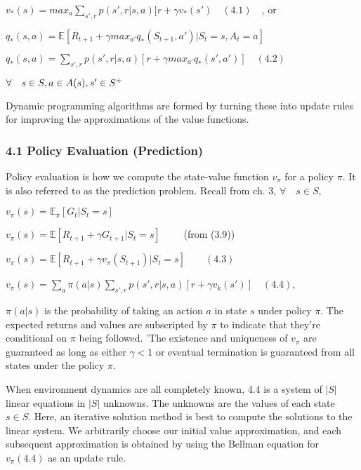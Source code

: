 \documentclass[11pt]{article}
\begin{document}
\(v_*(s) = max_a \sum_{s', r} p(s', r | s, a)[r + \gamma v_*(s') \quad (4.1) \quad\),
or

\(q_*(s, a) = \mathbb{E}[R_{t+1} + \gamma max_{a'} q_*(S_{t+1}, a') | S_t = s, A_t = a]\)

\(q_*(s, a) = \sum_{s', r} p(s', r | s, a) [r + \gamma max_{a'} q_*(s', a')] \quad (4.2) \quad\)

\(\forall \quad s \in S, \space a \in A(s), \space s' \in S^+\)

Dynamic programming algorithms are formed by turning these into update
rules for improving the approximations of the value functions.

    \subsubsection{4.1 Policy Evaluation
(Prediction)}\label{policy-evaluation-prediction}

    Policy evaluation is how we compute the state-value function \(v_\pi\)
for a policy \(\pi\). It is also referred to as the prediction problem.
Recall from ch. 3, \(\forall \quad s \in S\),

\(v_\pi(s) \stackrel{.}{=} \mathbb{E}_\pi [G_t | S_t = s]\)

\(v_\pi(s) = \mathbb{E} [R_{t+1} + \gamma G_{t+1} | S_t = s] \quad \quad\)
(from (3.9))

\(v_\pi(s) = \mathbb{E} [R_{t+1} + \gamma v_\pi(S_{t+1}) | S_t = s] \quad \quad (4.3)\)

\(v_\pi(s) = \sum_a \pi(a | s) \sum_{s', r} p(s', r | s, a)[r + \gamma v_k(s')] \quad (4.4)\),

\(\pi (a | s)\) is the probability of taking an action \(a\) in state
\(s\) under policy \(\pi\). The expected returns and values are
subscripted by \(\pi\) to indicate that they're conditional on \(\pi\)
being followed. 'The existence and uniqueness of \(v_\pi\) are
guaranteed as long as either \(\gamma < 1\) or eventual termination is
guaranteed from all states under the policy \(\pi\).

    When environment dynamics are all completely known, 4.4 is a system of
\(|S|\) linear equations in \(|S|\) unknowns. The unknowns are the
values of each state \(s \in S\). Here, an iterative solution method is
best to compute the solutions to the linear system. We arbitrarily
choose our initial value approximation, and each subsequent
approximation is obtained by using the Bellman equation for
\(v_\pi (4.4)\) as an update rule.
\end{document}
